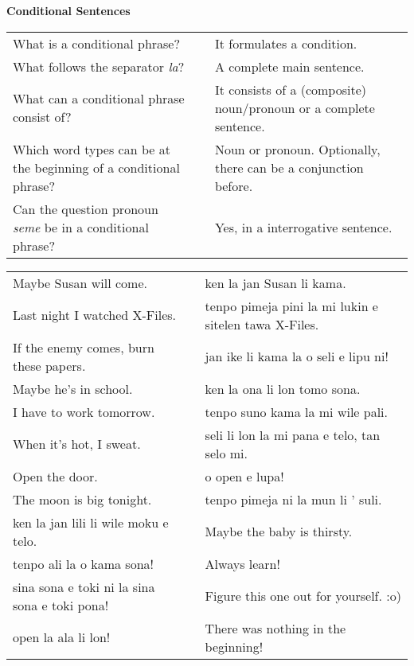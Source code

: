 \textbf{Conditional Sentences} 
\label{'la'}

\begin{supertabular}{p{5,5cm}|ll}
What is a conditional phrase? && It formulates a condition. \\  %
What follows the separator \textit{la}? && A complete main sentence.  \\  %
What can a conditional phrase consist of?  && It consists of a (composite) noun/pronoun or a complete sentence. \\  %
Which word types can be at the beginning of a conditional phrase? && Noun or pronoun. Optionally, there can be a conjunction before. \\  %
Can the question pronoun \textit{seme} be in a conditional phrase? && Yes, in a interrogative sentence.  \\  %
\end{supertabular}

\begin{supertabular}{p{5,5cm}|ll}
Maybe Susan will come.  && ken la jan Susan li kama. \\ %
Last night I watched X-Files.  && tenpo pimeja pini la mi lukin e sitelen tawa X-Files. \\ %
If the enemy comes, burn these papers.  && jan ike li kama la o seli e lipu ni! \\ %
Maybe he's in school.  && ken la ona li lon tomo sona. \\ %
I have to work tomorrow.  && tenpo suno kama la mi wile pali. \\ %
When it's hot, I sweat.  && seli li lon la mi pana e telo, tan selo mi. \\ %
Open the door.  && o open e lupa! \\ %
The moon is big tonight.  && tenpo pimeja ni la mun li ' suli. \\ %
ken la jan lili li wile moku e telo.  && Maybe the baby is thirsty. \\
tenpo ali la o kama sona!  && Always learn!  \\
sina sona e toki ni la sina sona e toki pona!  && Figure this one out for yourself. :o) \\
open la ala li lon! && There was nothing in the beginning! \\
\end{supertabular}  
